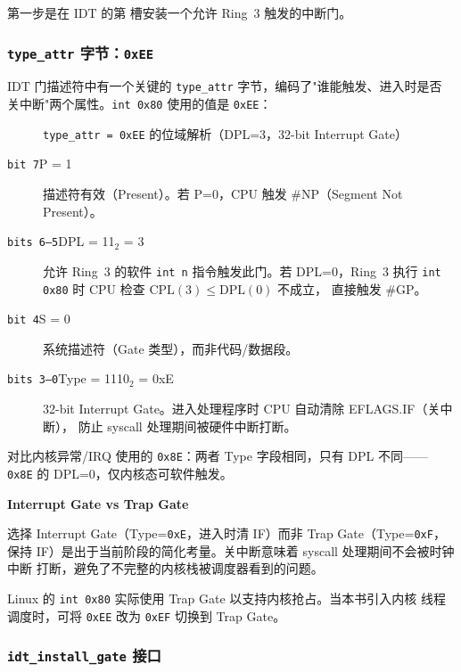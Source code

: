 第一步是在 IDT 的第  槽安装一个允许 Ring~3 触发的中断门。

\subsubsection{\texttt{type\_attr} 字节：\texttt{0xEE}}

IDT 门描述符中有一个关键的 \texttt{type\_attr} 字节，编码了"谁能触发、进入时是否
关中断"两个属性。\texttt{int 0x80} 使用的值是 \texttt{0xEE}：

\begin{figure}[H]
  \centering
  
  \caption{\texttt{type\_attr = 0xEE} 的位域解析（DPL=3，32-bit Interrupt Gate）}
  \label{fig:type-attr}
\end{figure}

\begin{description}
  \item[\texttt{bit 7}\enspace P = 1]
    描述符有效（Present）。若 P=0，CPU 触发 \#NP（Segment Not Present）。
  \item[\texttt{bits 6--5}\enspace DPL = 11$_2$ = 3]
    允许 Ring~3 的软件 \texttt{int n} 指令触发此门。若 DPL=0，Ring~3 执行
    \texttt{int 0x80} 时 CPU 检查 $\text{CPL}(3) \leq \text{DPL}(0)$ 不成立，
    直接触发 \#GP。
  \item[\texttt{bit 4}\enspace S = 0]
    系统描述符（Gate 类型），而非代码/数据段。
  \item[\texttt{bits 3--0}\enspace Type = 1110$_2$ = 0xE]
    32-bit Interrupt Gate。进入处理程序时 CPU 自动清除 EFLAGS.IF（关中断），
    防止 syscall 处理期间被硬件中断打断。
\end{description}

对比内核异常/IRQ 使用的 \texttt{0x8E}：两者 Type 字段相同，只有 DPL 不同——
\texttt{0x8E} 的 DPL=0，仅内核态可软件触发。

\begin{warnbox}
\textbf{Interrupt Gate vs Trap Gate}

选择 Interrupt Gate（Type=\texttt{0xE}，进入时清 IF）而非 Trap Gate（Type=\texttt{0xF}，
保持 IF）是出于当前阶段的简化考量。关中断意味着 syscall 处理期间不会被时钟中断
打断，避免了不完整的内核栈被调度器看到的问题。

Linux 的 \texttt{int 0x80} 实际使用 Trap Gate 以支持内核抢占。当本书引入内核
线程调度时，可将 \texttt{0xEE} 改为 \texttt{0xEF} 切换到 Trap Gate。
\end{warnbox}

\subsubsection{\texttt{idt\_install\_gate} 接口}


